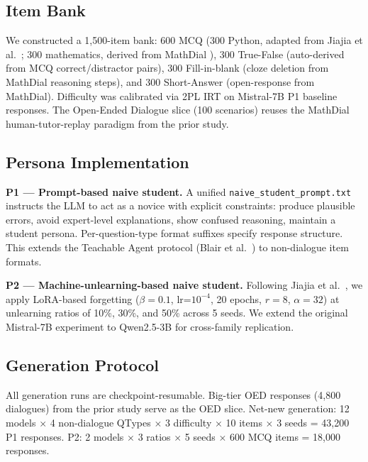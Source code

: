 \documentclass[10pt,twocolumn]{IEEEtran}
\begin{document}
\subsection{Item Bank}

We constructed a 1,500-item bank: 600 MCQ (300 Python, adapted from Jiajia et al.\
\cite{Jiajia2026}; 300 mathematics, derived from MathDial \cite{macina2023mathdial}),
300 True-False (auto-derived from MCQ correct/distractor pairs), 300 Fill-in-blank
(cloze deletion from MathDial reasoning steps), and 300 Short-Answer (open-response
from MathDial). Difficulty was calibrated via 2PL IRT on Mistral-7B P1 baseline
responses. The Open-Ended Dialogue slice (100 scenarios) reuses the MathDial
human-tutor-replay paradigm from the prior study.

\subsection{Persona Implementation}

\textbf{P1 — Prompt-based naive student.}
A unified \texttt{naive\_student\_prompt.txt} instructs the LLM to act as a novice
with explicit constraints: produce plausible errors, avoid expert-level explanations,
show confused reasoning, maintain a student persona. Per-question-type format
suffixes specify response structure. This extends the Teachable Agent protocol
(Blair et al.\ \cite{blair2007}) to non-dialogue item formats.

\textbf{P2 — Machine-unlearning-based naive student.}
Following Jiajia et al.\ \cite{Jiajia2026}, we apply LoRA-based forgetting
(\(\beta=0.1\), lr=$10^{-4}$, 20 epochs, $r=8$, $\alpha=32$) at unlearning
ratios of 10\%, 30\%, and 50\% across 5 seeds. We extend the original Mistral-7B
experiment to Qwen2.5-3B for cross-family replication.

\subsection{Generation Protocol}

All generation runs are checkpoint-resumable. Big-tier OED responses (4,800
dialogues) from the prior study serve as the OED slice. Net-new generation:
12 models $\times$ 4 non-dialogue QTypes $\times$ 3 difficulty $\times$ 10 items
$\times$ 3 seeds = 43,200 P1 responses. P2: 2 models $\times$ 3 ratios $\times$
5 seeds $\times$ 600 MCQ items = 18,000 responses.

\end{document}

